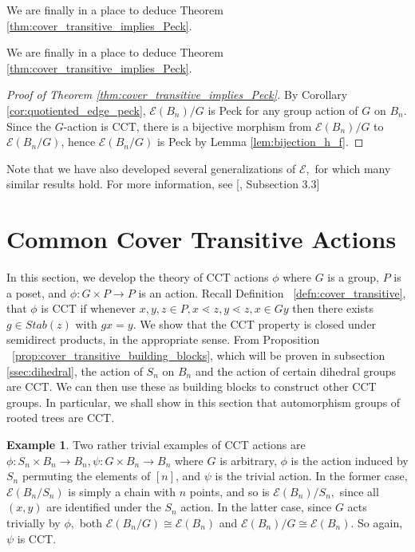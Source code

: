 \documentclass[10 pt]{amsart}
\theoremstyle{plain}
\theoremstyle{definition}
\newtheorem{eg}[thm]{Example}
\theoremstyle{remark}
\numberwithin{equation}{section}
\begin{document}
We are finally in a place to deduce Theorem \ref{thm:cover_transitive_implies_Peck}.

We are finally in a place to deduce Theorem \ref{thm:cover_transitive_implies_Peck}.

\begin{proof}[Proof of Theorem \ref{thm:cover_transitive_implies_Peck}]
By Corollary \ref{cor:quotiented_edge_peck}, $\mathcal{E}(B_n)/G$ is Peck for any group action of $G$ on $B_n.$ Since the $G$-action is CCT, there is a bijective morphism from $\mathcal{E}(B_n)/G$ to $\mathcal{E}(B_n/G)$, hence $\mathcal{E}(B_n/G)$ is Peck by Lemma \ref{lem:bijection_h_f}.
\end{proof}

Note that we have also developed several generalizations of $\mathcal E,$ for which many similar results hold. For more information, see [\cite{reu_report}, Subsection 3.3]

\section{Common Cover Transitive Actions}
\label{sec:cover_transitive}
In this section, we develop the theory of CCT actions $\phi$ where $G$ is a group, $P$ is a poset, and $\phi:G\times P \rightarrow P$ is an action. Recall Definition ~\ref{defn:cover_transitive}, that $\phi$ is CCT if whenever $x,y,z \in P,x\lessdot z,y\lessdot z,x \in Gy$ then there exists $g \in Stab(z)$ with $gx = y$.  We show that the CCT property is closed under semidirect products, in the appropriate sense. From Proposition ~\ref{prop:cover_transitive_building_blocks}, which will be proven in subsection \ref{ssec:dihedral}, the action of $S_n$ on $B_n$ and the action of certain dihedral groups are CCT. We can then use these as building blocks to construct other CCT groups. In particular, we shall show in this section that automorphism groups of rooted trees are CCT.

\begin{eg}
\label{eg:trivial_edgequot}
Two rather trivial examples of CCT actions are $\phi:S_n\times B_n \rightarrow B_n,\psi:G\times B_n\rightarrow B_n$ where $G$ is arbitrary, $\phi$ is the action induced by $S_n$ permuting the elements of $[n]$, and $\psi$ is the trivial action. In the former case, $\mathcal E(B_n/S_n)$ is simply a chain with $n$ points, and so is $\mathcal E(B_n)/S_n,$ since all $(x, y)$ are identified under the $S_n$ action. In the latter case, since $G$ acts trivially by $\phi,$ both  $\mathcal E(B_n/G) \cong \mathcal E(B_n)$ and $\mathcal E(B_n)/G \cong \mathcal E(B_n).$ So again, $\psi$ is CCT.
\end{eg}
\end{document}
